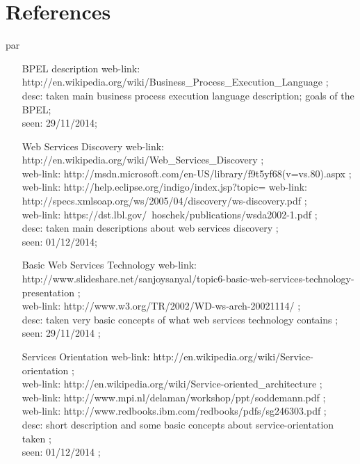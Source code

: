 \section{References}
par {
\begin{enumerate}
\item [BPEL description] web-link: http://en.wikipedia.org/wiki/Business_Process_Execution_Language ; \\ desc: taken main business process execution language description; goals of the BPEL; \\ seen: 29/11/2014; \\
\item [Web Services Discovery] web-link: http://en.wikipedia.org/wiki/Web_Services_Discovery ; \\ 
web-link: http://msdn.microsoft.com/en-US/library/f9t5yf68(v=vs.80).aspx ; \\
web-link: http://help.eclipse.org/indigo/index.jsp?topic=%
web-link: http://specs.xmlsoap.org/ws/2005/04/discovery/ws-discovery.pdf ; \\
web-link: https://dst.lbl.gov/~hoschek/publications/wsda2002-1.pdf ; \\
desc: taken main descriptions about web services discovery ; \\ seen: 01/12/2014; \\
\item [Basic Web Services Technology] web-link: http://www.slideshare.net/sanjoysanyal/topic6-basic-web-services-technology-presentation ; \\ 
web-link: http://www.w3.org/TR/2002/WD-ws-arch-20021114/ ; \\ desc: taken very basic concepts of what web services technology contains ; \\ seen: 29/11/2014 ; \\
\item [Services Orientation] web-link: http://en.wikipedia.org/wiki/Service-orientation ; \\ 
web-link: http://en.wikipedia.org/wiki/Service-oriented_architecture ; \\ 
web-link: http://www.mpi.nl/delaman/workshop/ppt/soddemann.pdf ; \\ 
web-link: http://www.redbooks.ibm.com/redbooks/pdfs/sg246303.pdf ; \\ desc: short description and some basic concepts about service-orientation taken ; \\ seen: 01/12/2014 ; \\

\end{enumerate}}
